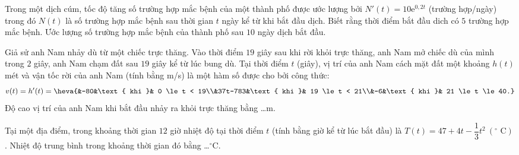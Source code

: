 \begin{bt}%
	Trong một dịch cúm, tốc độ  tăng số trường hợp mắc bệnh của một thành phố được ước lượng bởi $N'(t)=10 \mathrm{e}^{0{,}2t}$ (trường hợp/ngày) trong đó $N(t)$ là số trường hợp mắc bệnh sau thời gian $t$ ngày kể từ khi bắt đầu dịch. Biết rằng thời điểm bắt đầu dich có $5$ trường hợp mắc bệnh. Ước lượng số trường hợp mắc bệnh của thành phố sau $10$ ngày dịch bắt đầu.
\end{bt}

\begin{bt}%
	Giả sử anh Nam nhảy dù từ một chiếc trực thăng. Vào thời  điểm $19$ giây sau khi rời khỏi trực thăng, anh Nam mở chiếc dù của mình trong $2$ giây, anh Nam chạm đất sau $19$ giây kể từ lúc bung dù. Tại thời điểm $t$ (giây), vị trí của anh Nam cách mặt đất một khoảng $h(t)$ mét và vận tốc rời của anh Nam (tính bằng m/s) là một hàm số được cho bởi công thức: $$v(t)=h'(t)=\heva{&-80&\text{ khi }& 0 \le t < 19\\&37t-783&\text{ khi }& 19 \le t < 21\\&-6&\text{ khi }& 21 \le t \le 40.}$$
	Độ cao vị trí của anh Nam khi bắt  đầu nhảy ra khỏi trực thăng bằng \ldots m.
\end{bt}

\begin{bt}%
	Tại một địa điểm, trong khoảng thời gian $12$ giờ nhiệt độ tại thời điểm $t$ (tính bằng giờ kể từ lúc bắt đầu) là $T(t)=47+4t-\dfrac{1}{3}t^2\ \left({}^{\circ}\text{ C}\right)$. Nhiệt độ trung bình trong khoảng thời gian  đó bằng \ldots ${}^{\circ}$C.
\end{bt}


